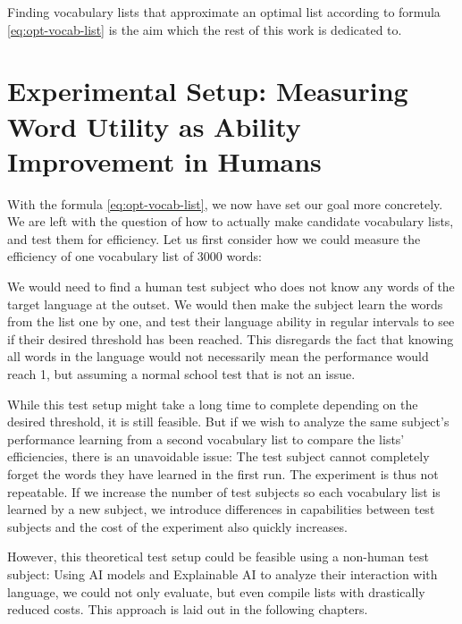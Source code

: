 Finding vocabulary lists that approximate an optimal list according to formula \ref{eq:opt-vocab-list} is the aim which the rest of this work is dedicated to.


\section{Experimental Setup: Measuring Word Utility as Ability Improvement in Humans} \label{sec:human-efficiency-testing}


With the formula \ref{eq:opt-vocab-list}, we now have set our goal more concretely.
We are left with the question of how to actually make candidate vocabulary lists, and test them for efficiency.
Let us first consider how we could measure the efficiency of one vocabulary list of 3000 words:

We would need to find a human test subject who does not know any words of the target language at the outset.
We would then make the subject learn the words from the list one by one, and test their language ability in regular intervals to see if their desired threshold has been reached.
This disregards the fact that knowing all words in the language would not necessarily mean the performance would reach 1, but assuming a normal school test that is not an issue.

While this test setup might take a long time to complete depending on the desired threshold, it is still feasible.
But if we wish to analyze the same subject's performance learning from a second vocabulary list to compare the lists' efficiencies, there is an unavoidable issue:
The test subject cannot completely forget the words they have learned in the first run.
The experiment is thus not repeatable.
If we increase the number of test subjects so each vocabulary list is learned by a new subject, we introduce differences in capabilities between test subjects and the cost of the experiment also quickly increases.

However, this theoretical test setup could be feasible using a non-human test subject:
Using AI models and Explainable AI to analyze their interaction with language, we could not only evaluate, but even compile lists with drastically reduced costs.
This approach is laid out in the following chapters.

